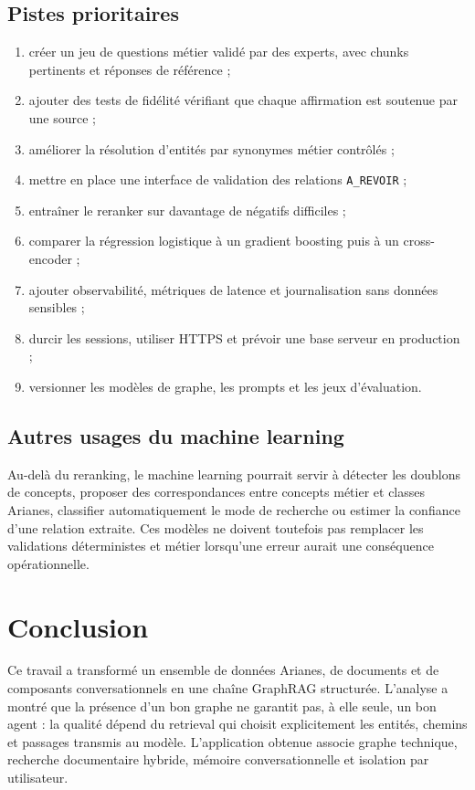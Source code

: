 \documentclass[12pt,a4paper,oneside]{report}
\begin{document}
\section{Pistes prioritaires}
\begin{enumerate}
  \item créer un jeu de questions métier validé par des experts, avec chunks pertinents et réponses de référence ;
  \item ajouter des tests de fidélité vérifiant que chaque affirmation est soutenue par une source ;
  \item améliorer la résolution d'entités par synonymes métier contrôlés ;
  \item mettre en place une interface de validation des relations \texttt{A\_REVOIR} ;
  \item entraîner le reranker sur davantage de négatifs difficiles ;
  \item comparer la régression logistique à un gradient boosting puis à un cross-encoder ;
  \item ajouter observabilité, métriques de latence et journalisation sans données sensibles ;
  \item durcir les sessions, utiliser HTTPS et prévoir une base serveur en production ;
  \item versionner les modèles de graphe, les prompts et les jeux d'évaluation.
\end{enumerate}

\section{Autres usages du machine learning}
Au-delà du reranking, le machine learning pourrait servir à détecter les doublons de concepts, proposer des correspondances entre concepts métier et classes Arianes, classifier automatiquement le mode de recherche ou estimer la confiance d'une relation extraite. Ces modèles ne doivent toutefois pas remplacer les validations déterministes et métier lorsqu'une erreur aurait une conséquence opérationnelle.

\chapter{Conclusion}
Ce travail a transformé un ensemble de données Arianes, de documents et de composants conversationnels en une chaîne GraphRAG structurée. L'analyse a montré que la présence d'un bon graphe ne garantit pas, à elle seule, un bon agent : la qualité dépend du retrieval qui choisit explicitement les entités, chemins et passages transmis au modèle. L'application obtenue associe graphe technique, recherche documentaire hybride, mémoire conversationnelle et isolation par utilisateur.
\end{document}
